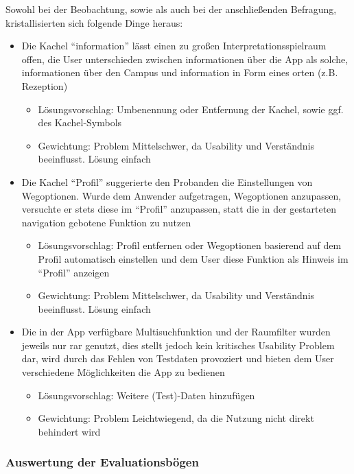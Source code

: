 Sowohl bei der Beobachtung, sowie als auch bei der anschließenden Befragung, kristallisierten sich folgende Dinge heraus:
\begin{itemize}
    \item Die Kachel “\gls{information}” lässt einen zu großen Interpretationsspielraum offen, die User unterschieden zwischen \gls{information}en über die App als solche, \gls{information}en über den Campus und \gls{information} in Form eines \gls{ort}en (z.B. Rezeption)
    \begin{itemize}
        \item Lösungsvorschlag: Umbenennung oder Entfernung der Kachel, sowie ggf. des Kachel-Symbols
        \item Gewichtung: Problem Mittelschwer, da Usability und Verständnis beeinflusst. Lösung einfach
    \end{itemize}
    \item Die Kachel “Profil” suggerierte den Probanden die Einstellungen von Wegoptionen. Wurde dem Anwender aufgetragen, Wegoptionen anzupassen, versuchte er stets diese im “Profil” anzupassen, statt die in der gestarteten \gls{navigation} gebotene Funktion zu nutzen
    \begin{itemize}
        \item Lösungsvorschlag: Profil entfernen oder Wegoptionen basierend auf dem Profil automatisch einstellen und dem User diese Funktion als Hinweis im “Profil” anzeigen
        \item Gewichtung: Problem Mittelschwer, da Usability und Verständnis beeinflusst. Lösung einfach
    \end{itemize}
    \item Die in der App verfügbare Multisuchfunktion und der Raumfilter wurden jeweils nur rar genutzt, dies stellt jedoch kein kritisches Usability Problem dar, wird durch das Fehlen von Testdaten provoziert und bieten dem User verschiedene Möglichkeiten die App zu bedienen
    \begin{itemize}
        \item Lösungsvorschlag: Weitere (Test)-Daten hinzufügen
        \item Gewichtung: Problem Leichtwiegend, da die Nutzung nicht direkt behindert wird
    \end{itemize}
\end{itemize}
\newpage
\subsubsection*{Auswertung der Evaluationsbögen}

